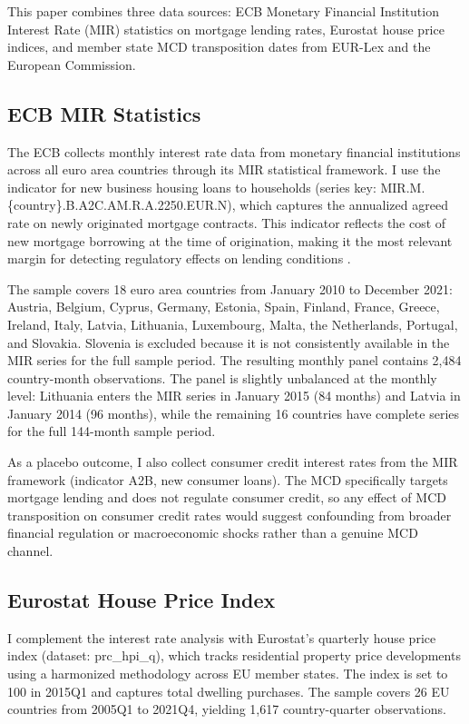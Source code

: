 \documentclass[12pt]{article}
\begin{document}
This paper combines three data sources: ECB Monetary Financial Institution Interest Rate (MIR) statistics on mortgage lending rates, Eurostat house price indices, and member state MCD transposition dates from EUR-Lex and the European Commission.

\subsection{ECB MIR Statistics}

The ECB collects monthly interest rate data from monetary financial institutions across all euro area countries through its MIR statistical framework. I use the indicator for new business housing loans to households (series key: MIR.M.\{country\}.B.A2C.AM.R.A.2250.EUR.N), which captures the annualized agreed rate on newly originated mortgage contracts. This indicator reflects the cost of new mortgage borrowing at the time of origination, making it the most relevant margin for detecting regulatory effects on lending conditions \citep{ecb_mir_manual}.

The sample covers 18 euro area countries from January 2010 to December 2021: Austria, Belgium, Cyprus, Germany, Estonia, Spain, Finland, France, Greece, Ireland, Italy, Latvia, Lithuania, Luxembourg, Malta, the Netherlands, Portugal, and Slovakia. Slovenia is excluded because it is not consistently available in the MIR series for the full sample period. The resulting monthly panel contains 2,484 country-month observations. The panel is slightly unbalanced at the monthly level: Lithuania enters the MIR series in January 2015 (84 months) and Latvia in January 2014 (96 months), while the remaining 16 countries have complete series for the full 144-month sample period.

As a placebo outcome, I also collect consumer credit interest rates from the MIR framework (indicator A2B, new consumer loans). The MCD specifically targets mortgage lending and does not regulate consumer credit, so any effect of MCD transposition on consumer credit rates would suggest confounding from broader financial regulation or macroeconomic shocks rather than a genuine MCD channel.

\subsection{Eurostat House Price Index}

I complement the interest rate analysis with Eurostat's quarterly house price index (dataset: prc\_hpi\_q), which tracks residential property price developments using a harmonized methodology across EU member states. The index is set to 100 in 2015Q1 and captures total dwelling purchases. The sample covers 26 EU countries from 2005Q1 to 2021Q4, yielding 1,617 country-quarter observations.
\end{document}

